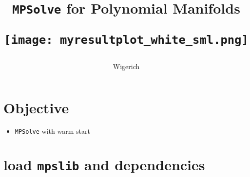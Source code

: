 \documentclass{article}\usepackage[]{graphicx}\usepackage[dvipsnames,table]{xcolor}
\title{
\vskip 1cm
{\bf\huge {\tt MPSolve}}
\vskip 5mm
{\bf\huge for}
\vskip 5mm
{\bf\huge Polynomial Manifolds}
\vskip 1cm
\begin{center}
\texttt{[image: myresultplot\_white\_sml.png]}
\end{center}
\vskip 1cm
}
\author{Wigerich}
\begin{document}
\maketitle

\newpage
\tableofcontents

\newpage
\section{Objective}

\begin{itemize}
    \item {\tt MPSolve} with warm start
\end{itemize}

\newpage
\section{load {\tt mpslib} and dependencies}
\end{document}
